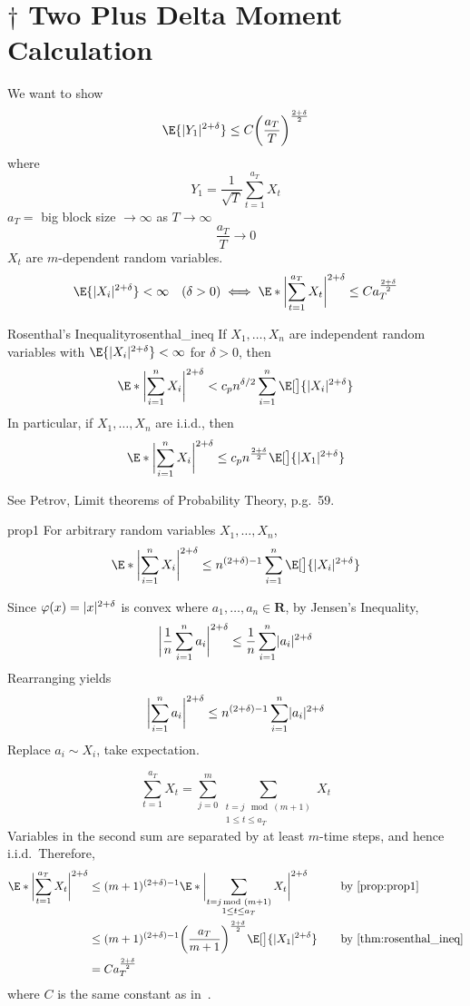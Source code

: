 \section{\texorpdfstring{$ \dagger $}{†} Two Plus Delta Moment Calculation}
We want to show
\[ \E{\abs{Y_1}^{2+\delta}}\le C\biggl(\frac{a_T}{T} \biggr)^{\frac{2+\delta}{2}} \]
where
\[ Y_1=\frac{1}{\sqrt{T}} \sum_{t=1}^{a_T} X_t \]
$ a_T= $ big block size $ \to\infty $ as $ T\to\infty $
\[ \frac{a_T}{T} \to 0 \]
$ X_t $ are $ m $-dependent random variables.
\[ \E{\abs{X_i}^{2+\delta}}<\infty\quad(\delta>0)\iff
    \E*{\abs[\bigg]{\sum_{t=1}^{a_T} X_t}^{2+\delta}}\le C a_T^{\frac{2+\delta}{2}} \]
\begin{Theorem}{Rosenthal's Inequality}{rosenthal_ineq}
    If $ X_1,\ldots,X_n $ are independent random variables
    with $ \E{\abs{X_i}^{2+\delta}}<\infty $ for $ \delta>0 $, then
    \[ \E*{\abs[\bigg]{\sum_{i=1}^{n} X_i}^{2+\delta}}<c_p n^{\delta/2}\sum_{i=1}^{n}
        \E[\big]{\abs{X_i}^{2+\delta}} \]
    In particular, if $ X_1,\ldots,X_n $ are i.i.d., then
    \[ \E*{\abs[\bigg]{\sum_{i=1}^{n} X_i}^{2+\delta}}\le c_p n^{\frac{2+\delta}{2}}
        \E[\big]{\abs{X_1}^{2+\delta}} \]
\end{Theorem}
\begin{Proof}{}{}
    See Petrov, Limit theorems of Probability Theory, p.g.\ 59.
\end{Proof}
\begin{Proposition}{}{prop1}
    For arbitrary random variables $ X_1,\ldots,X_n $,
    \[ \E*{\abs[\bigg]{\sum_{i=1}^{n} X_i}^{2+\delta}}\le n^{(2+\delta)-1}
        \sum_{i=1}^{n}\E[\big]{\abs{X_i}^{2+\delta}} \]
\end{Proposition}
\begin{Proof}{}{}
    Since $ \varphi(x)=\abs{x}^{2+\delta} $ is convex where $ a_1,\ldots,a_n\in\mathbf{R} $,
    by Jensen's Inequality,
    \[ \abs[\bigg]{\frac{1}{n} \sum_{i=1}^{n} a_i}^{2+\delta}\le \frac{1}{n} \sum_{i=1}^{n} \abs{a_i}^{2+\delta} \]
    Rearranging yields
    \[ \abs[\bigg]{\sum_{i=1}^{n} a_i}^{2+\delta}\le
        n^{(2+\delta)-1}\sum_{i=1}^{n} \abs{a_i}^{2+\delta} \]
    Replace $ a_i\sim X_i $, take expectation.
\end{Proof}
\[ \sum_{t=1}^{a_T} X_t=\sum_{j=0}^{m}
    \sum_{\substack{t=j\!\!\!\mod (m+1)\\1\le t\le a_T}}X_t  \]
Variables in the second sum are separated by at least
$ m $-time steps, and hence i.i.d.\ Therefore,
\begin{align*}
    \E*{\abs[\bigg]{\sum_{t=1}^{a_T} X_t}^{2+\delta}}
     & \le (m+1)^{(2+\delta)-1}
    \E*{\abs[\bigg]{\sum_{\substack{t=j\!\!\!\mod (m+1)                                                                                                    \\1\le t\le a_T}}X_t}^{2+\delta}} & \quad & \text{by~\Cref{prop:prop1}}\\
     & \le (m+1)^{(2+\delta)-1}\biggl(\frac{a_T}{m+1} \biggr)^{\frac{2+\delta}{2} }\E[\big]{\abs{X_1}^{2+\delta}} &  & \text{by~\Cref{thm:rosenthal_ineq}} \\
     & =C a_T^{\frac{2+\delta}{2}}
\end{align*}
where $ C $ is the same constant as in~.

